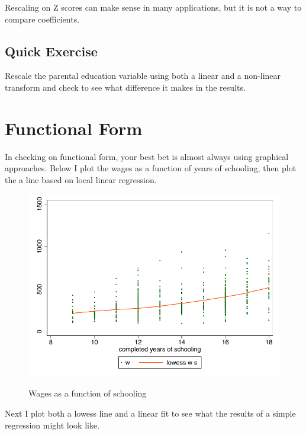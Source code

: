 \documentclass[12pt]{article}
\begin{document}
Rescaling on Z scores can make sense in many applications, but it is
not a way to compare coefficients. 

\subsection{Quick Exercise}

Rescale the parental education variable using both a linear and a
non-linear transform and check to see what
difference it makes in the results. 

\section{Functional Form}
\label{sec:functional-form}

In checking on functional form, your best bet is almost always using
graphical approaches. Below I plot the wages as a function of years of
schooling, then plot the a line based on local linear regression. 

\begin{figure}[ht!]
  \centering
  \caption{Wages as a function of schooling}
  \includegraphics{lowess1}
  \label{fig:lowess1}
\end{figure}

Next I plot both a lowess line and a linear fit to see what the
results of a simple regression might look like. 
\end{document}
